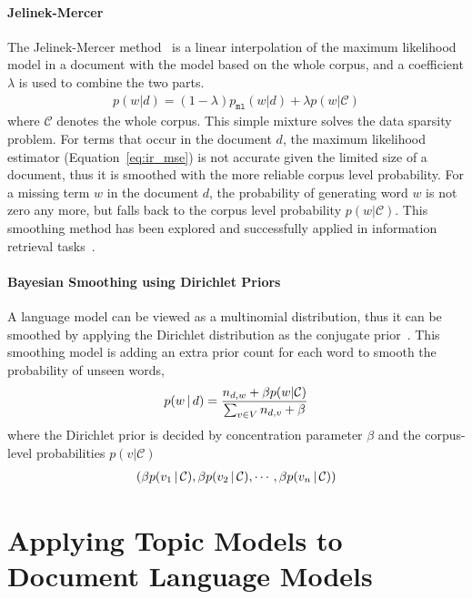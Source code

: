 \paragraph{Jelinek-Mercer}

The Jelinek-Mercer method~\citep{Jelinek-1980} is a linear
interpolation of the maximum likelihood model in a document with the
model based on the whole corpus, and a coefficient $\lambda$ is used
to combine the two parts.
\begin{align}
p(w|d) = (1 - \lambda) p_{\texttt{ml}}(w|d) + \lambda p(w|\mathcal{C})
\label{eq:lm-jr}
\end{align}
where $\mathcal{C}$ denotes the whole corpus. This simple mixture
solves the data sparsity problem. For terms that occur in the document
$d$, the maximum likelihood estimator (Equation~\ref{eq:ir_mse}) is
not accurate given the limited size of a document, thus it is smoothed
with the more reliable corpus level probability. For a missing term
$w$ in the document $d$, the probability of generating word $w$ is not
zero any more, but falls back to the corpus level probability
$p(w|\mathcal{C})$.  This smoothing method has been explored and
successfully applied in information retrieval
tasks~\citep{PonteCroft,song-99}.

\paragraph{Bayesian Smoothing using Dirichlet Priors}

A language model can be viewed as a multinomial distribution, thus it
can be smoothed by applying the Dirichlet distribution as the
conjugate prior~\citep{mackay95dirichlet}. This smoothing model is
adding an extra prior count for each word to smooth the probability of
unseen words,
\begin{align}
p(w \, | \, d) = \frac{n_{d,w} + \beta p(w|\mathcal{C})}{\sum_{v \in V} n_{d,v} + \beta}
\end{align}
where the Dirichlet prior is decided by concentration parameter $\beta$ and the
corpus-level probabilities $p(v|\mathcal{C})$
\begin{align}
(\beta p(v_1 \, | \, \mathcal{C}), \beta p(v_2 \, | \, \mathcal{C}), \cdots, \beta p(v_n \, | \, \mathcal{C}))
\label{eq:lm-bs}
\end{align}

\section{Applying Topic Models to Document Language Models}

